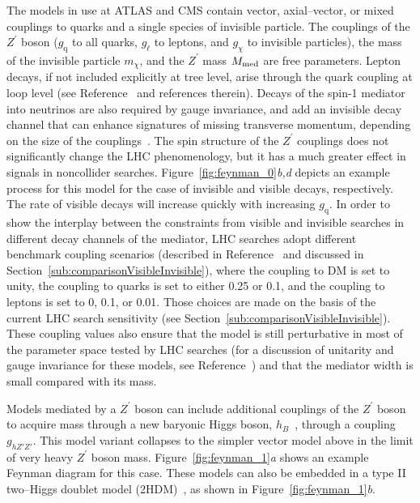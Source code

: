 \documentclass{ar-1col}
\newcommand{\chiDM}{\ensuremath{\chi}\xspace}
\newcommand{\IP}{invisible particle}
\newcommand{\mMed}{\ensuremath{M_{\rm{med}}}\xspace}
\newcommand{\mmed}{\mMed}
\newcommand{\gDM}{\ensuremath{g_{\chiDM}}\xspace}
\newcommand{\gl}{$g_{\ell}$\xspace}
\newcommand{\gq}{$g_{\mathrm{q}}$\xspace}
\newcommand{\mdm}{\ensuremath{m_{\chiDM}}\xspace}
\newcommand{\ghZprimeZprime}{\ensuremath{g_{hZ'Z'}}\xspace}
\newcommand{\Zprime}{\ensuremath{{Z}^\prime}\xspace}
\begin{document}
{The models in use at ATLAS and CMS contain vector,
axial--vector, or mixed couplings to quarks and a single species of
{\IP}. The couplings of the \Zprime boson (\gq to all quarks, \gl to
leptons, and \gDM to {\IP}s), the mass of the invisible particle \mdm, and the
\Zprime mass \mmed are free parameters. Lepton decays, if not
included explicitly at tree level, arise through the quark
coupling at loop level (see Reference~ and
references therein). Decays of the spin-1 mediator into neutrinos
are also required by gauge invariance, and add an invisible decay
channel that can enhance signatures of missing transverse
momentum, depending on the size of the
couplings~\cite{Albert:2017onk}. The spin structure of the \Zprime
couplings does not significantly change the LHC phenomenology, but it
has a much greater effect in signals in noncollider searches.
Figure~\ref{fig:feynman_0}\textit{b,d} depicts an example process for this model for the case of invisible and visible decays, respectively. 
The rate of visible decays will increase quickly with increasing \gq.
In order to show the interplay between the constraints from visible
and invisible searches in different decay channels of the mediator,
LHC searches adopt different benchmark coupling scenarios
(described in Reference~ and discussed in Section~\ref{sub:comparisonVisibleInvisible}),
where the coupling to DM is set to unity, the coupling to quarks is set to either 0.25 or 0.1, 
and the coupling to leptons is set to 0, 0.1, or 0.01. 
Those choices are made on the basis of the current LHC search sensitivity
(see Section~\ref{sub:comparisonVisibleInvisible}). These coupling values also 
ensure that the model is still perturbative in most of the parameter space
tested by LHC searches (for a discussion of unitarity and gauge invariance for these models, see Reference~) and that the mediator width is small compared with its mass. 

Models mediated by a \Zprime boson can include additional couplings of the
\Zprime boson to acquire mass through a new baryonic Higgs boson,
$h_B$~\cite{Carpenter:2013xra}, through a coupling \ghZprimeZprime. 
This model variant collapses to the simpler vector model
above in the limit of very heavy \Zprime boson mass. 
Figure~\ref{fig:feynman_1}\textit{a} shows an example Feynman diagram for this case. 
These models can also be
embedded in a type II two--Higgs doublet model
(2HDM)~\cite{Berlin:2014cfa}, as shown in Figure~\ref{fig:feynman_1}\textit{b}.

}
\end{document}
